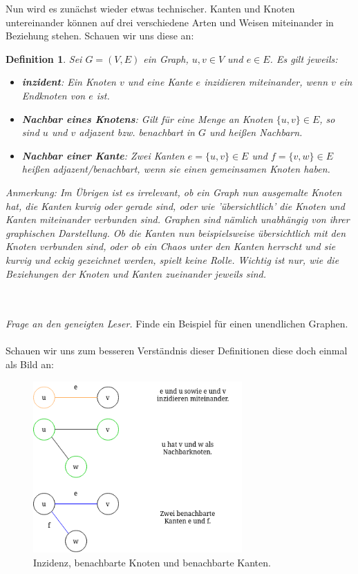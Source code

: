 \documentclass{article}
\newtheorem{definition}{Definition}
\theoremstyle{plain}
\begin{document}
\newpage
Nun wird es zunächst wieder etwas technischer. Kanten und Knoten untereinander können auf drei verschiedene Arten und Weisen miteinander in Beziehung stehen. Schauen wir uns diese an:\\
\begin{definition}
    Sei \(G = (V, E)\) ein Graph, \(u, v \in V\) und \(e \in E\).
    Es gilt jeweils:
    \begin{itemize}
        \item \textbf{inzident}:
            Ein Knoten \(v\) und eine Kante \(e\) \emph{inzidieren} miteinander, wenn \(v\) ein \emph{Endknoten} von \(e\) ist.
        \item \textbf{Nachbar eines Knotens}:
            Gilt für eine Menge an Knoten \(\{u, v\} \in E\), so sind \(u\) und \(v\) \emph{adjazent} bzw. \textit{benachbart} in \(G\) und heißen \emph{Nachbarn}.
        \item \textbf{Nachbar einer Kante}:
            Zwei Kanten \(e = \{u, v\} \in E\) und \(f = \{v, w\} \in E\) heißen \emph{adjazent/benachbart}, wenn sie einen gemeinsamen Knoten haben.\cite[S.~4]{bue_1}
    \end{itemize}
\end{definition}
\begin{small}
    \emph{
        Anmerkung: Im Übrigen ist es irrelevant, ob ein Graph nun ausgemalte Knoten hat, die Kanten kurvig oder gerade sind, oder wie 'übersichtlich' die Knoten und Kanten miteinander verbunden sind. Graphen sind nämlich unabhängig von ihrer graphischen Darstellung. Ob die Kanten nun beispielsweise übersichtlich mit den Knoten verbunden sind, oder ob ein Chaos unter den Kanten herrscht und sie kurvig und eckig gezeichnet werden, spielt keine Rolle. Wichtig ist nur, \emph{wie} die Beziehungen der Knoten und Kanten zueinander jeweils sind.
    }
\end{small}\\\\
\emph{Frage an den geneigten Leser.} Finde ein Beispiel für einen unendlichen Graphen.\\\\
Schauen wir uns zum besseren Verständnis dieser Definitionen diese doch einmal als Bild an:\\
\bigskip
\begin{figure}[!htp]
    \centering
    \includegraphics[width=8cm]{vortrag_schriftlich/images/inzident.drawio.png}
    \caption{Inzidenz, benachbarte Knoten und benachbarte Kanten.}
    \label{fig:fig10}
\end{figure}
\newpage
\end{document}
